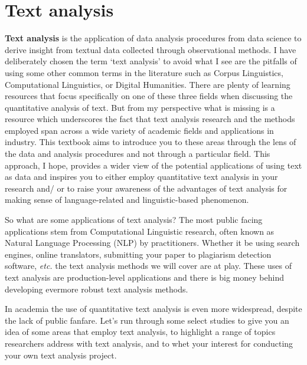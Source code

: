 \documentclass[
  letterpaper,
]{scrbook}
\begin{document}
\hypertarget{text-analysis}{%
\section{Text analysis}\label{text-analysis}}

\textbf{Text analysis} is the application of data analysis procedures
from data science to derive insight from textual data collected through
observational methods. I have deliberately chosen the term `text
analysis' to avoid what I see are the pitfalls of using some other
common terms in the literature such as Corpus Linguistics, Computational
Linguistics, or Digital Humanities. There are plenty of learning
resources that focus specifically on one of these three fields when
discussing the quantitative analysis of text. But from my perspective
what is missing is a resource which underscores the fact that text
analysis research and the methods employed span across a wide variety of
academic fields and applications in industry. This textbook aims to
introduce you to these areas through the lens of the data and analysis
procedures and not through a particular field. This approach, I hope,
provides a wider view of the potential applications of using text as
data and inspires you to either employ quantitative text analysis in
your research and/ or to raise your awareness of the advantages of text
analysis for making sense of language-related and linguistic-based
phenomenon.

So what are some applications of text analysis? The most public facing
applications stem from Computational Linguistic research, often known as
Natural Language Processing (NLP) by practitioners. Whether it be using
search engines, online translators, submitting your paper to plagiarism
detection software, \emph{etc.} the text analysis methods we will cover
are at play. These uses of text analysis are production-level
applications and there is big money behind developing evermore robust
text analysis methods.

In academia the use of quantitative text analysis is even more
widespread, despite the lack of public fanfare. Let's run through some
select studies to give you an idea of some areas that employ text
analysis, to highlight a range of topics researchers address with text
analysis, and to whet your interest for conducting your own text
analysis project.
\end{document}
